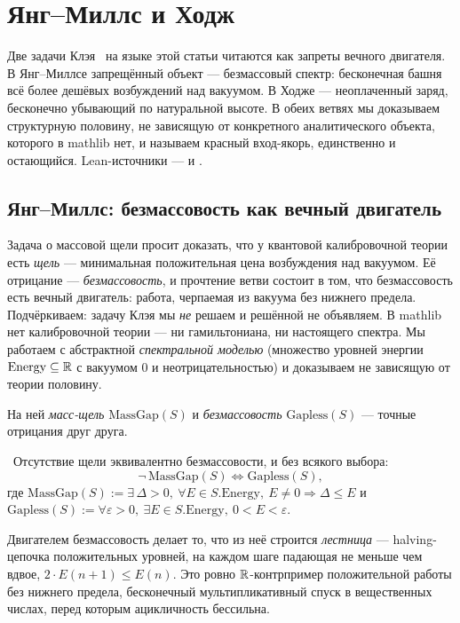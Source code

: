 \section{Янг–Миллс и Ходж}\label{sec:ymhodge}

Две задачи Клэя~\cite{clay-ym,clay-hodge} на языке этой статьи читаются как запреты вечного
двигателя. В Янг--Миллсе запрещённый объект --- безмассовый спектр: бесконечная башня всё более
дешёвых возбуждений над вакуумом. В Ходже --- неоплаченный заряд, бесконечно убывающий по натуральной
высоте. В обеих ветвях мы доказываем структурную половину, не зависящую от конкретного аналитического
объекта, которого в mathlib нет, и называем красный вход-якорь, единственно и остающийся. Lean-источники
---  и .

\subsection{Янг–Миллс: безмассовость как вечный двигатель}

Задача о массовой щели просит доказать, что у квантовой калибровочной теории есть \emph{щель} ---
минимальная положительная цена возбуждения над вакуумом. Её отрицание --- \emph{безмассовость}, и
прочтение ветви состоит в том, что безмассовость есть вечный двигатель: работа, черпаемая из вакуума
без нижнего предела. Подчёркиваем: задачу Клэя мы \emph{не} решаем и решённой не объявляем. В mathlib
нет калибровочной теории --- ни гамильтониана, ни настоящего спектра. Мы работаем с абстрактной
\emph{спектральной моделью}  (множество уровней энергии
$\mathrm{Energy}\subseteq\mathbb{R}$ с вакуумом $0$ и неотрицательностью) и доказываем не зависящую от теории
половину.

На ней \emph{масс-щель} $\mathrm{MassGap}(S)$ и \emph{безмассовость} $\mathrm{Gapless}(S)$ ---
точные отрицания друг друга.

\begin{theorem}\label{thm:not_massGap_iff_gapless}
\green{}\ Отсутствие щели эквивалентно безмассовости, и без всякого выбора:
\[
  \neg\,\mathrm{MassGap}(S)\iff\mathrm{Gapless}(S),
\]
где $\mathrm{MassGap}(S):=\exists\,\Delta>0,\ \forall E\in S.\mathrm{Energy},\ E\neq 0\Rightarrow\Delta\le E$
и $\mathrm{Gapless}(S):=\forall\varepsilon>0,\ \exists E\in S.\mathrm{Energy},\ 0<E<\varepsilon$.
\end{theorem}

Двигателем безмассовость делает то, что из неё строится \emph{лестница} --- halving-цепочка
положительных уровней, на каждом шаге падающая не меньше чем вдвое, $2\cdot E(n+1)\le E(n)$. Это ровно
$\mathbb{R}$-контрпример положительной работы без нижнего предела, бесконечный мультипликативный спуск в
вещественных числах, перед которым ацикличность бессильна.

